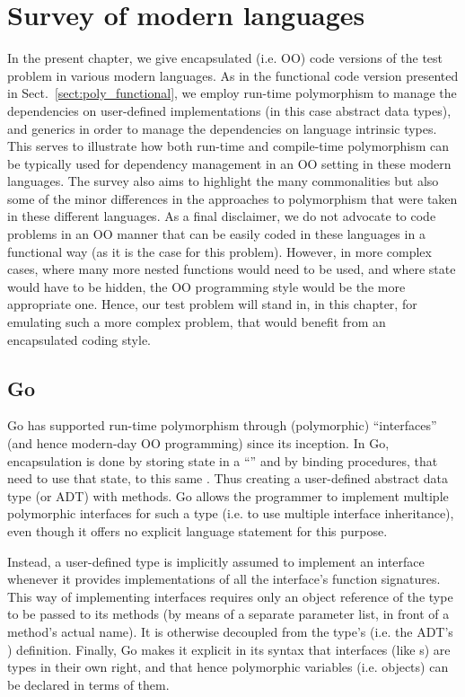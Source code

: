 \documentclass[11pt,oneside]{report}
\newcommand{\code}[1]{{\selectfont\ttfamily{#1}}}
\begin{document}
\chapter{Survey of modern languages}
\label{sect:survey}

In the present chapter, we give encapsulated (i.e. OO) code versions
of the test problem in various modern languages. As in the functional
code version presented in Sect.~\ref{sect:poly_functional}, we employ
run-time polymorphism to manage the dependencies on user-defined
implementations (in this case abstract data types), and generics in
order to manage the dependencies on language intrinsic types. This
serves to illustrate how both run-time and compile-time polymorphism
can be typically used for dependency management in an OO setting in
these modern languages. The survey also aims to highlight the many
commonalities but also some of the minor differences in the approaches
to polymorphism that were taken in these different languages. As a
final disclaimer, we do not advocate to code problems in an OO manner
that can be easily coded in these languages in a functional way (as it
is the case for this problem). However, in more complex cases, where
many more nested functions would need to be used, and where state
would have to be hidden, the OO programming style would be the more
appropriate one. Hence, our test problem will stand in, in this
chapter, for emulating such a more complex problem, that would
benefit from an encapsulated coding style.


\section{Go}

Go has supported run-time polymorphism through (polymorphic)
``interfaces'' (and hence modern-day OO programming) since its
inception. In Go, encapsulation is done by storing state in a
``\code{struct}'' and by binding procedures, that need to use that
state, to this same \code{struct}. Thus creating a user-defined
abstract data type (or ADT) with methods. Go allows the programmer to
implement multiple polymorphic interfaces for such a type (i.e. to use
multiple interface inheritance), even though it offers no explicit
language statement for this purpose.

Instead, a user-defined type is implicitly assumed to implement an
interface whenever it provides implementations of all the interface's
function signatures. This way of implementing interfaces requires only
an object reference of the type to be passed to its methods (by means
of a separate parameter list, in front of a method's actual name). It
is otherwise decoupled from the type's (i.e. the ADT's \code{struct})
definition. Finally, Go makes it explicit in its syntax that
interfaces (like \code{struct}s) are types in their own right, and
that hence polymorphic variables (i.e. objects) can be declared in
terms of them.
\end{document}
